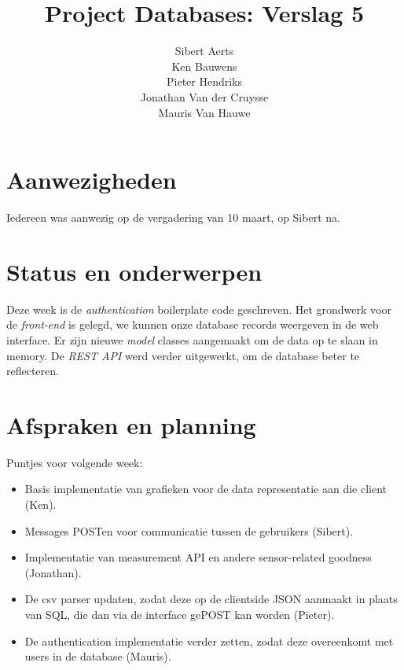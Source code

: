 \documentclass[10pt,a4paper]{article}
\author{Sibert Aerts\\
Ken Bauwens\\
Pieter Hendriks\\
Jonathan Van der Cruysse\\
Mauris Van Hauwe}
\title{Project Databases: Verslag 5}
\date{}
\begin{document}
  \maketitle
  \section{Aanwezigheden}
  Iedereen was aanwezig op de vergadering van 10 maart, op Sibert na.
  
  \section{Status en onderwerpen}
  Deze week is de \emph{authentication} boilerplate code geschreven. 
  Het grondwerk voor de \emph{front-end} is gelegd, we kunnen onze database records weergeven in de web interface.
  Er zijn nieuwe \emph{model} classes aangemaakt om de data op te slaan in memory.
  De \emph{REST API} werd verder uitgewerkt, om de database beter te reflecteren.
  
  \section{Afspraken en planning}
  Puntjes voor volgende week:
  \begin{itemize}
    \item Basis implementatie van grafieken voor de data representatie aan die client (Ken).
    \item Messages POSTen voor communicatie tussen de gebruikers (Sibert).
    \item Implementatie van measurement API en andere sensor-related goodness (Jonathan).
    \item De csv parser updaten, zodat deze op de clientside JSON aanmaakt in plaats van SQL, die dan via de interface gePOST kan worden (Pieter).
    \item De authentication implementatie verder zetten, zodat deze overeenkomt met users in de database (Mauris).
  \end{itemize}
\end{document}
